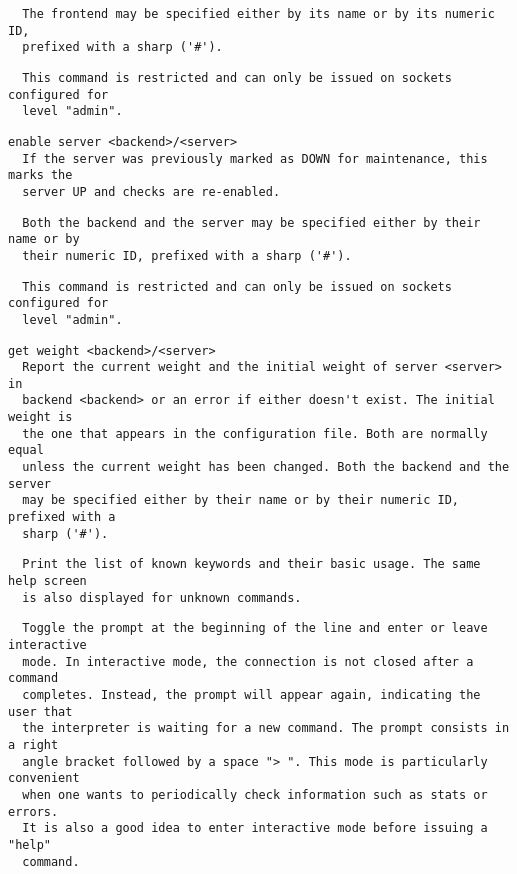 \begin{verbatim}
  The frontend may be specified either by its name or by its numeric ID,
  prefixed with a sharp ('#').
\end{verbatim}

\begin{verbatim}
  This command is restricted and can only be issued on sockets configured for
  level "admin".
\end{verbatim}

\begin{verbatim}
enable server <backend>/<server>
  If the server was previously marked as DOWN for maintenance, this marks the
  server UP and checks are re-enabled.
\end{verbatim}

\begin{verbatim}
  Both the backend and the server may be specified either by their name or by
  their numeric ID, prefixed with a sharp ('#').
\end{verbatim}

\begin{verbatim}
  This command is restricted and can only be issued on sockets configured for
  level "admin".
\end{verbatim}

\begin{verbatim}
get weight <backend>/<server>
  Report the current weight and the initial weight of server <server> in
  backend <backend> or an error if either doesn't exist. The initial weight is
  the one that appears in the configuration file. Both are normally equal
  unless the current weight has been changed. Both the backend and the server
  may be specified either by their name or by their numeric ID, prefixed with a
  sharp ('#').
\end{verbatim}

\begin{verbatim}
  Print the list of known keywords and their basic usage. The same help screen
  is also displayed for unknown commands.
\end{verbatim}

\begin{verbatim}
  Toggle the prompt at the beginning of the line and enter or leave interactive
  mode. In interactive mode, the connection is not closed after a command
  completes. Instead, the prompt will appear again, indicating the user that
  the interpreter is waiting for a new command. The prompt consists in a right
  angle bracket followed by a space "> ". This mode is particularly convenient
  when one wants to periodically check information such as stats or errors.
  It is also a good idea to enter interactive mode before issuing a "help"
  command.
\end{verbatim}

